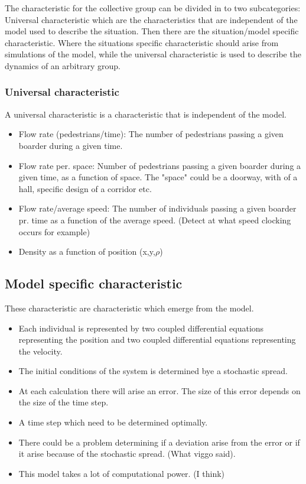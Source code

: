 The characteristic for the collective group can be divided in to two subcategories: Universal 
characteristic which are the characteristics that are independent of the model used to describe
the situation. Then there are the situation/model specific characteristic. Where the situations specific 
characteristic should arise from simulations of the model, while the universal characteristic 
is used to describe the dynamics of an arbitrary group. 

\subsubsection{Universal characteristic}
A universal characteristic is a characteristic that is independent of the model.

\begin{itemize}
\item Flow rate (pedestrians/time): The number of pedestrians passing a given 
boarder during a given time.
\item Flow rate per. space: Number of pedestrians passing a given boarder during 
a given time, as a function of space. The "space" could be a doorway, with of a
 hall, specific design of a corridor etc.
\item Flow rate/average speed: The number of individuals passing a given boarder pr. 
time as a function of the average speed. (Detect at what speed clocking occurs for example)
\item Density as a function of position (x,y,$\rho$)
\end{itemize}

\subsection{Model specific characteristic}
These characteristic are characteristic which emerge from the model.

\begin{itemize}
\item Each individual is represented by two coupled differential equations representing the position and two coupled differential equations representing the velocity.
\item The initial conditions of the system is determined bye a stochastic spread.
\item At each calculation there will arise an error. The size of this error depends on the size of the time step.
\item A time step which need to be determined optimally.
\item There could be a problem determining if a deviation arise from the error or if it arise because of the stochastic spread. (What viggo said).
\item This model takes a lot of computational power. (I think)
\end{itemize}


